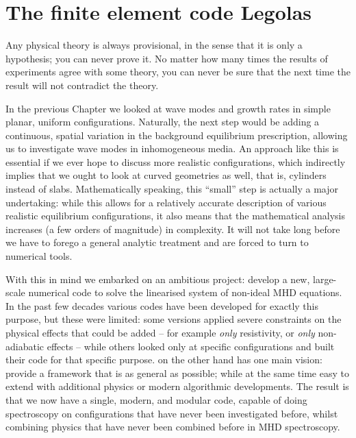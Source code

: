 \chapter{The finite element code Legolas} \label{ch: legolas}

\graphicspath{{04-legolas/figures/}}

\begin{chapterquote}
  Any physical theory is always provisional, in the sense that it is only a hypothesis; you can never prove it. No matter how many times the results of experiments agree with some theory, you can never be sure that the next time the result will not contradict the theory.
\end{chapterquote}


In the previous Chapter we looked at wave modes and growth rates in simple planar, uniform configurations. Naturally, the next step would be adding a continuous, spatial variation in the background equilibrium prescription, allowing us to investigate wave modes in inhomogeneous media. An approach like this is essential if we ever hope to discuss more realistic configurations, which indirectly implies that we ought to look at curved geometries as well, that is, cylinders instead of slabs. Mathematically speaking, this ``small'' step is actually a major undertaking: while this allows for a relatively accurate description of various realistic equilibrium configurations, it also means that the mathematical analysis increases (a few orders of magnitude) in complexity. It will not take long before we have to forego a general analytic treatment and are forced to turn to numerical tools.

With this in mind we embarked on an ambitious project: develop a new, large-scale numerical code to solve the linearised system of non-ideal MHD equations. In the past few decades various codes have been developed for exactly this purpose, but these were limited: some versions applied severe constraints on the physical effects that could be added -- for example \emph{only} resistivity, or \emph{only} non-adiabatic effects -- while others looked only at specific configurations and built their code for that specific purpose. {\legolas} on the other hand has one main vision: provide a framework that is as general as possible; while at the same time easy to extend with additional physics or modern algorithmic developments. The result is that we now have a single, modern, and modular code, capable of doing spectroscopy on configurations that have never been investigated before, whilst combining physics that have never been combined before in MHD spectroscopy.

